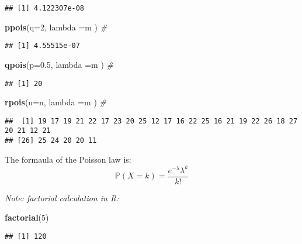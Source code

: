 \documentclass[
]{article}
\newenvironment{Shaded}{\begin{snugshade}}{\end{snugshade}}
\newcommand{\AttributeTok}[1]{\textcolor[rgb]{0.13,0.29,0.53}{#1}}
\newcommand{\CommentTok}[1]{\textcolor[rgb]{0.56,0.35,0.01}{\textit{#1}}}
\newcommand{\DecValTok}[1]{\textcolor[rgb]{0.00,0.00,0.81}{#1}}
\newcommand{\FloatTok}[1]{\textcolor[rgb]{0.00,0.00,0.81}{#1}}
\newcommand{\FunctionTok}[1]{\textcolor[rgb]{0.13,0.29,0.53}{\textbf{#1}}}
\newcommand{\NormalTok}[1]{#1}
\begin{document}
\begin{verbatim}
## [1] 4.122307e-08
\end{verbatim}

\begin{Shaded}
\begin{Highlighting}[]
\FunctionTok{ppois}\NormalTok{(}\AttributeTok{q=}\DecValTok{2}\NormalTok{, }\AttributeTok{lambda =}\NormalTok{m ) }\CommentTok{\# }
\end{Highlighting}
\end{Shaded}

\begin{verbatim}
## [1] 4.55515e-07
\end{verbatim}

\begin{Shaded}
\begin{Highlighting}[]
\FunctionTok{qpois}\NormalTok{(}\AttributeTok{p=}\FloatTok{0.5}\NormalTok{, }\AttributeTok{lambda =}\NormalTok{m ) }\CommentTok{\# }
\end{Highlighting}
\end{Shaded}

\begin{verbatim}
## [1] 20
\end{verbatim}

\begin{Shaded}
\begin{Highlighting}[]
\FunctionTok{rpois}\NormalTok{(}\AttributeTok{n=}\NormalTok{n, }\AttributeTok{lambda =}\NormalTok{m ) }\CommentTok{\# }
\end{Highlighting}
\end{Shaded}

\begin{verbatim}
##  [1] 19 17 19 21 22 17 23 20 25 12 17 16 22 25 16 21 19 22 26 18 27 20 21 12 21
## [26] 25 24 20 20 11
\end{verbatim}

The formaula of the Poisson law is:
\[\mathbb{P}(X = k) = \frac{e^{-\lambda} \lambda^k}{k!}\]

\emph{Note: factorial calculation in R:}

\begin{Shaded}
\begin{Highlighting}[]
\FunctionTok{factorial}\NormalTok{(}\DecValTok{5}\NormalTok{)}
\end{Highlighting}
\end{Shaded}

\begin{verbatim}
## [1] 120
\end{verbatim}
\end{document}
